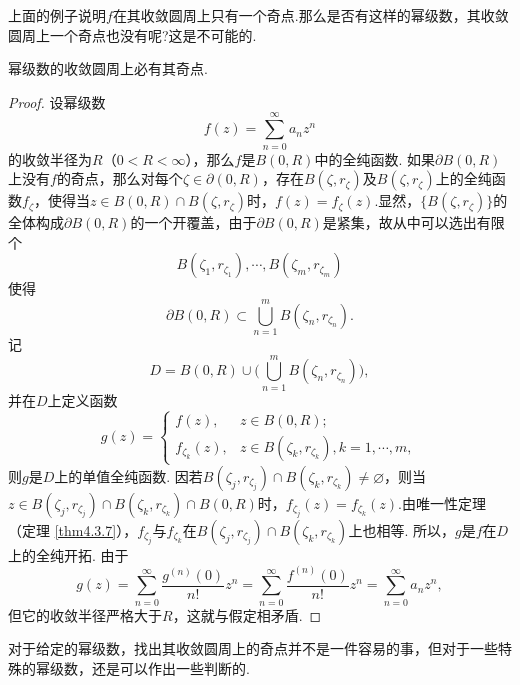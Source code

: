 上面的例子说明$f$在其收敛圆周上只有一个奇点.那么是否有这样的幂级数，其收敛圆周上一个奇点也没有呢?这是不可能的.
\begin{theorem}\label{thm6.2.3}
  幂级数的收敛圆周上必有其奇点.
\end{theorem}
\begin{proof}
  设幂级数
  \[
    f(z) = \sum_{n=0}^\infty a_nz^n
  \]
  的收敛半径为$R$（$0<R<\infty$），那么$f$是$B(0,R)$中的全纯函数.
  如果$\partial B(0,R)$上没有$f$的奇点，那么对每个$\zeta\in\partial(0,R)$，存在$B(\zeta,r_\zeta)$及$B(\zeta,r_\zeta)$上的全纯函数$f_\zeta$，使得当$z\in B(0,R)\cap B(\zeta,r_\zeta)$时，$f(z)=f_\zeta(z)$.显然，$\{B(\zeta,r_\zeta)\}$的全体构成$\partial B(0,R)$的一个开覆盖，由于$\partial B(0,R)$是紧集，故从中可以选出有限个
  \[
    B(\zeta_1,r_{\zeta_1}),\cdots,B(\zeta_m,r_{\zeta_m})
  \]
  使得
  \[
    \partial B(0,R)\subset\bigcup_{n=1}^m B(\zeta_n,r_{\zeta_n}).
  \]
  记
  \[
    D = B(0,R)\cup\big(\bigcup_{n=1}^mB(\zeta_n,r_{\zeta_n})\big),
  \]
  并在$D$上定义函数
  \[
    g(z) = \begin{cases}
      f(z), & z \in B(0,R);\\
      f_{\zeta_k}(z), & z\in B(\zeta_k,r_{\zeta_k}),k=1,\cdots,m,
     \end{cases}
  \]
  则$g$是$D$上的单值全纯函数. 因若$B(\zeta_j,r_{\zeta_j})\cap B(\zeta_k,r_{\zeta_k})
  \ne\varnothing$，则当$z\in B(\zeta_j,r_{\zeta_j})\cap B(\zeta_k,r_{\zeta_k})\cap B(0,R)$时，$f_{\zeta_j}(z)=f_{\zeta_k}(z)$.由唯一性定理（定理 \ref{thm4.3.7}），$f_{\zeta_j}$与$f_{\zeta_k}$在$B(\zeta_j,r_{\zeta_j})\cap B(\zeta_k,r_{\zeta_k})$上也相等. 所以，$g$是$f$在$D$上的全纯开拓. 由于
  \[
    g(z) = \sum_{n=0}^\infty \frac{g^{(n)}(0)}{n!}z^n = \sum_{n=0}^\infty
    \frac{f^{(n)}(0)}{n!}z^n=\sum_{n=0}^\infty a_nz^n,
  \]
  但它的收敛半径严格大于$R$，这就与假定相矛盾.
\end{proof}

对于给定的幂级数，找出其收敛圆周上的奇点并不是一件容易的事，但对于一些特殊的幂级数，还是可以作出一些判断的.

